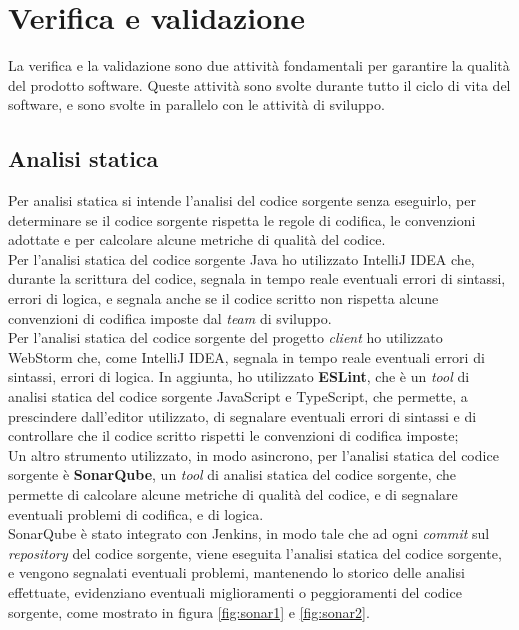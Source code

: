 \section{Verifica e validazione}
La verifica e la validazione sono due attività fondamentali per garantire la qualità del prodotto software.
Queste attività sono svolte durante tutto il ciclo di vita del software, e sono svolte in parallelo con le attività di sviluppo.
\subsection*{Analisi statica}
Per analisi statica si intende l'analisi del codice sorgente senza eseguirlo, per determinare se il codice sorgente rispetta 
le regole di codifica, le convenzioni adottate e per calcolare alcune metriche di qualità del codice.\\
Per l'analisi statica del codice sorgente Java ho utilizzato IntelliJ IDEA che,
durante la scrittura del codice, segnala in tempo reale eventuali errori di sintassi, errori di logica, e segnala anche
se il codice scritto non rispetta alcune convenzioni di codifica imposte dal \textit{team} di sviluppo.\\

Per l'analisi statica del codice sorgente del progetto \textit{client} ho utilizzato WebStorm che, come IntelliJ IDEA,
segnala in tempo reale eventuali errori di sintassi, errori di logica.
In aggiunta, ho utilizzato \textbf{ESLint}, che è un \textit{tool} di analisi statica del codice sorgente JavaScript e
TypeScript, che permette, a prescindere dall'editor utilizzato, di segnalare eventuali errori di sintassi e di controllare
che il codice scritto rispetti le convenzioni di codifica imposte; \\

Un altro strumento utilizzato, in modo asincrono, per l'analisi statica del codice sorgente è \textbf{SonarQube}, 
un \textit{tool} di analisi statica del codice sorgente, che permette di calcolare alcune metriche di qualità del codice,
e di segnalare eventuali problemi di codifica, e di logica.\\
SonarQube è stato integrato con Jenkins, in modo tale che ad ogni \textit{commit} sul \textit{repository}
del codice sorgente, viene eseguita l'analisi statica del codice sorgente, e vengono segnalati eventuali problemi, mantenendo 
lo storico delle analisi effettuate, evidenziano eventuali miglioramenti o peggioramenti del codice sorgente, come mostrato in 
figura \ref{fig:sonar1} e \ref{fig:sonar2}.\\

